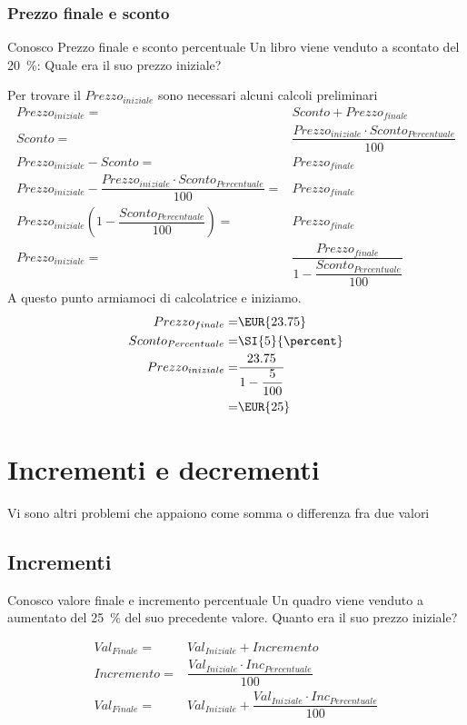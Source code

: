 \subsection{Prezzo finale e sconto}
	\begin{esempiot}{Conosco Prezzo finale e sconto percentuale}{}
Un libro viene venduto a  scontato del \SI{20}{\percent}: Quale era il suo prezzo iniziale?
\end{esempiot}
Per trovare il ${Prezzo}_{iniziale}$ sono necessari alcuni calcoli preliminari
\begin{align*}
	{Prezzo}_{iniziale}=&Sconto+{Prezzo}_{finale}\\
		Sconto=&\dfrac{{Prezzo}_{iniziale}\cdot {Sconto}_{Percentuale} }{100}\\
		{Prezzo}_{iniziale}-Sconto=&{Prezzo}_{finale}\\
	{Prezzo}_{iniziale}-\dfrac{{Prezzo}_{iniziale}\cdot {Sconto}_{Percentuale} }{100}=&{Prezzo}_{finale}\\
	{Prezzo}_{iniziale}\left(1-\dfrac{{Sconto}_{Percentuale} }{100}\right)=&{Prezzo}_{finale}\\
	{Prezzo}_{iniziale}=&\dfrac{{Prezzo}_{finale}}{1-\dfrac{{Sconto}_{Percentuale} }{100}}
\end{align*}
A questo punto armiamoci di calcolatrice e iniziamo.
\begin{align*}
	{Prezzo}_{finale}=&\mbox{\EUR{23.75}}\\
	{Sconto}_{Percentuale}=&\SI{5}{\percent}\\
{Prezzo}_{iniziale}=&\dfrac{23.75}{1-\dfrac{5}{100}}\\
=&\mbox{\EUR{25}}
\end{align*}
\chapter{Incrementi e decrementi}
Vi sono altri problemi che appaiono come somma o differenza fra due valori
\section{Incrementi}
	\begin{esempiot}{Conosco valore finale e incremento percentuale}{}
Un quadro viene venduto a   aumentato del \SI{25}{\percent} del suo precedente valore. Quanto era il suo prezzo iniziale?
\end{esempiot}
\begin{align*}
	{Val}_{Finale}=&{Val}_{Iniziale}+Incremento\\
	Incremento=&\dfrac{{Val}_{Iniziale}\cdot {Inc}_{Percentuale} }{100}\\
	{Val}_{Finale}=&{Val}_{Iniziale}+\dfrac{{Val}_{Iniziale}\cdot {Inc}_{Percentuale} }{100}\\
\end{align*}